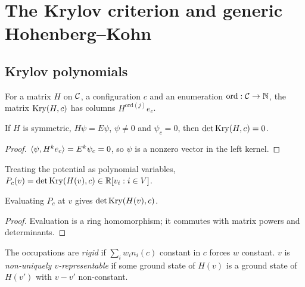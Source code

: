 \chapter{The Krylov criterion and generic Hohenberg--Kohn}
\label{chap:generic}

\section{Krylov polynomials}

\begin{definition}
  \label{def:kry}
  \leanok
  For a matrix $H$ on $\mathcal{C}$, a configuration $c$ and an enumeration $\mathrm{ord}:\mathcal{C}\to\mathbb{N}$, the matrix
  $\operatorname{Kry}(H,c)$ has columns $H^{\mathrm{ord}(j)}e_c$.
\end{definition}

\begin{lemma}
  \label{lem:det_kry_eq_zero}
  \leanok
  If $H$ is symmetric, $H\psi=E\psi$, $\psi\neq0$ and $\psi_c=0$, then $\det\operatorname{Kry}(H,c)=0$.
\end{lemma}
\begin{proof}
  \leanok
  $\langle \psi, H^ke_c\rangle=E^k\psi_c=0$, so $\psi$ is a nonzero vector in the left kernel.
\end{proof}

\begin{definition}
  \label{def:krylovPoly}
  \leanok
  Treating the potential as polynomial variables,
  $P_c(v)=\det\operatorname{Kry}(H(v),c)\in\mathbb{R}[v_i : i\in V]$.
\end{definition}

\begin{lemma}
  \label{lem:eval_krylovPoly}
  \leanok
  Evaluating $P_c$ at $v$ gives $\det\operatorname{Kry}(H(v),c)$.
\end{lemma}
\begin{proof}
  \leanok
  Evaluation is a ring homomorphism; it commutes with matrix powers and determinants.
\end{proof}

\begin{definition}
  \label{def:NonUV}
  \leanok
  The occupations are \emph{rigid} if $\sum_iw_in_i(c)$ constant in $c$ forces $w$ constant.
  $v$ is \emph{non-uniquely $v$-representable} if some ground state of $H(v)$ is a ground state of $H(v')$
  with $v-v'$ non-constant.
\end{definition}

